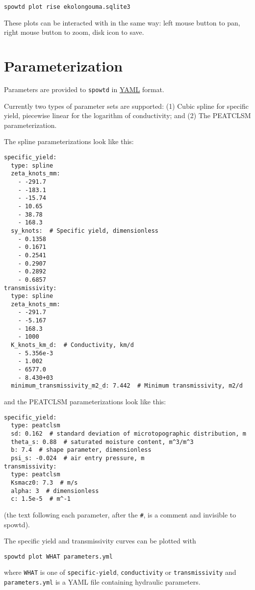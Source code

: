 \documentclass[11pt,a4paper]{article}
\begin{document}
\begin{lstlisting}[frame=single]
spowtd plot rise ekolongouma.sqlite3
\end{lstlisting}
These plots can be interacted with in the same way: left mouse button
to pan, right mouse button to zoom, disk icon to save.

\section{Parameterization}
Parameters are provided to \texttt{spowtd} in
\href{https://yaml.org/}{YAML} format.

Currently two types of parameter sets are supported: (1) Cubic spline
for specific yield, piecewise linear for the logarithm of
conductivity; and (2) The PEATCLSM parameterization.

The spline parameterizations look like this:
\begin{lstlisting}[frame=single]
specific_yield:
  type: spline
  zeta_knots_mm:
    - -291.7
    - -183.1
    - -15.74
    - 10.65
    - 38.78
    - 168.3
  sy_knots:  # Specific yield, dimensionless
    - 0.1358
    - 0.1671
    - 0.2541
    - 0.2907
    - 0.2892
    - 0.6857
transmissivity:
  type: spline
  zeta_knots_mm:
    - -291.7
    - -5.167
    - 168.3
    - 1000
  K_knots_km_d:  # Conductivity, km/d
    - 5.356e-3
    - 1.002
    - 6577.0
    - 8.430+03
  minimum_transmissivity_m2_d: 7.442  # Minimum transmissivity, m2/d
\end{lstlisting}
and the PEATCLSM parameterizations look like this:
\begin{lstlisting}[frame=single]
specific_yield:
  type: peatclsm
  sd: 0.162  # standard deviation of microtopographic distribution, m
  theta_s: 0.88  # saturated moisture content, m^3/m^3
  b: 7.4  # shape parameter, dimensionless
  psi_s: -0.024  # air entry pressure, m
transmissivity:
  type: peatclsm
  Ksmacz0: 7.3  # m/s
  alpha: 3  # dimensionless
  c: 1.5e-5  # m^-1
\end{lstlisting}
(the text following each parameter, after the \verb|#|, is a comment
and invisible to spowtd).

The specific yield and transmissivity curves can be plotted with
\begin{lstlisting}[frame=single]
  spowtd plot WHAT parameters.yml
\end{lstlisting}
where \texttt{WHAT} is one of \texttt{specific-yield},
\texttt{conductivity} or \texttt{transmissivity} and
\texttt{parameters.yml} is a YAML file containing hydraulic
parameters.
\end{document}
